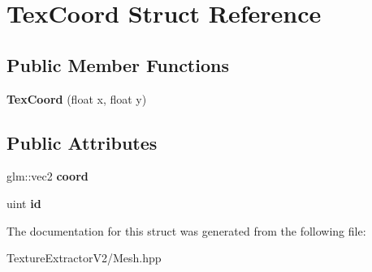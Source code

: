 \hypertarget{struct_tex_coord}{}\section{Tex\+Coord Struct Reference}
\label{struct_tex_coord}
\subsection*{Public Member Functions}
\begin{DoxyCompactItemize}
\item 
\hypertarget{struct_tex_coord_a02018ed90402d77cb313b581c0ea0561}{}{\bfseries Tex\+Coord} (float x, float y)\label{struct_tex_coord_a02018ed90402d77cb313b581c0ea0561}

\end{DoxyCompactItemize}
\subsection*{Public Attributes}
\begin{DoxyCompactItemize}
\item 
\hypertarget{struct_tex_coord_a31698d41a1be7a51cbaed632c4fae1e7}{}glm\+::vec2 {\bfseries coord}\label{struct_tex_coord_a31698d41a1be7a51cbaed632c4fae1e7}

\item 
\hypertarget{struct_tex_coord_aef29d0ef3a3fdcefdda756a2820e2a23}{}uint {\bfseries id}\label{struct_tex_coord_aef29d0ef3a3fdcefdda756a2820e2a23}

\end{DoxyCompactItemize}


The documentation for this struct was generated from the following file\+:\begin{DoxyCompactItemize}
\item 
Texture\+Extractor\+V2/Mesh.\+hpp\end{DoxyCompactItemize}
